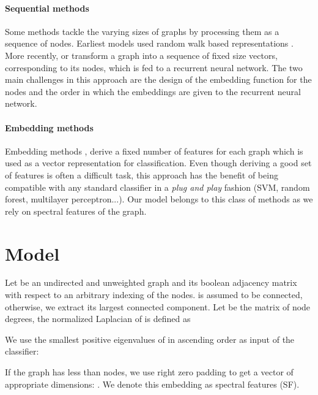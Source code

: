 \documentclass{article}
\begin{document}
\paragraph{Sequential methods}
Some methods tackle the varying sizes of graphs by processing them as a sequence of nodes. Earliest models used random walk based representations \citep{callut2008classification, xu2012protein}. More recently, \cite{jin2018learning} or \cite{you2018graphrnn} transform a graph into a sequence of fixed size vectors, corresponding to its nodes, which is fed to a recurrent neural network. The two main challenges in this approach are the design of the embedding function for the nodes and the order in which the embeddings are given to the recurrent neural network.

\paragraph{Embedding methods}
Embedding methods \citep{gomez2017dynamics, barnett2016feature, dutta2017high, DBLP:journals/corr/NarayananCVCLJ17}, derive a fixed number of features for each graph which is used as a vector representation for classification. Even though deriving a good set of features is often a difficult task, this approach has the benefit of being compatible with any standard classifier in a \textit{plug and play} fashion (SVM, random forest, multilayer perceptron...). Our model belongs to this class of methods as we rely on spectral features of the graph.

\section{Model}
\label{sec:model}




Let  be an undirected and unweighted graph and  its boolean adjacency matrix with respect to an arbitrary indexing of the nodes.  is assumed to be connected, otherwise, we extract its largest connected component. Let  be the matrix of node degrees, the normalized Laplacian of  is defined as



We use the  smallest positive eigenvalues of  in ascending order as input of the classifier:



If the graph has less than  nodes, we use right zero padding to get a vector of appropriate dimensions: . We denote this embedding as spectral features (SF).
\end{document}
